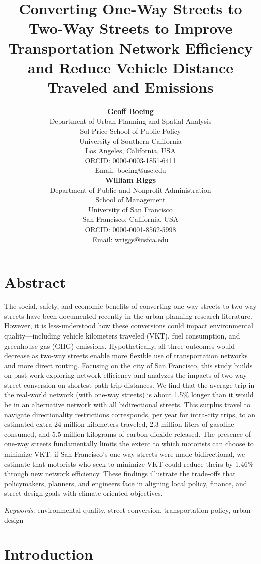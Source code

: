 \documentclass{trbunofficial}
\title{Converting One-Way Streets to Two-Way Streets to Improve Transportation Network Efficiency and Reduce Vehicle Distance Traveled and Emissions}
\author{%
  \textbf{Geoff Boeing}\\
  Department of Urban Planning and Spatial Analysis\\
  Sol Price School of Public Policy\\
  University of Southern California\\
  Los Angeles, California, USA\\
  ORCID: 0000-0003-1851-6411\\
  Email: boeing@usc.edu\\
  \hfill\break%
  \textbf{William Riggs}\\
  Department of Public and Nonprofit Administration\\
  School of Management\\
  University of San Francisco\\
  San Francisco, California, USA\\
  ORCID: 0000-0001-8562-5998\\
  Email: wriggs@usfca.edu
}
\begin{document}
\maketitle

\section{Abstract}

The social, safety, and economic benefits of converting one-way streets to two-way streets have been documented recently in the urban planning research literature. However, it is less-understood how these conversions could impact environmental quality---including vehicle kilometers traveled (VKT), fuel consumption, and greenhouse gas (GHG) emissions. Hypothetically, all three outcomes would decrease as two-way streets enable more flexible use of transportation networks and more direct routing. Focusing on the city of San Francisco, this study builds on past work exploring network efficiency and analyzes the impacts of two-way street conversion on shortest-path trip distances. We find that the average trip in the real-world network (with one-way streets) is about 1.5\% longer than it would be in an alternative network with all bidirectional streets. This surplus travel to navigate directionality restrictions corresponds, per year for intra-city trips, to an estimated extra 24 million kilometers traveled, 2.3 million liters of gasoline consumed, and 5.5 million kilograms of carbon dioxide released. The presence of one-way streets fundamentally limits the extent to which motorists can choose to minimize VKT: if San Francisco's one-way streets were made bidirectional, we estimate that motorists who seek to minimize VKT could reduce theirs by 1.46\% through new network efficiency. These findings illustrate the trade-offs that policymakers, planners, and engineers face in aligning local policy, finance, and street design goals with climate-oriented objectives.

\hfill\break%
\noindent\textit{Keywords}: environmental quality, street conversion, transportation policy, urban design
\newpage

\section{Introduction}
\end{document}
